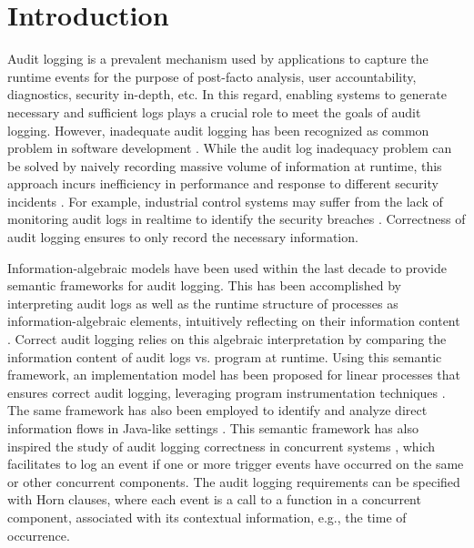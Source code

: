 \section{Introduction} \label{sec:intro}

Audit logging is a prevalent mechanism used by applications to capture the runtime events for the purpose of post-facto analysis, user accountability, diagnostics, security in-depth, etc. In this regard, enabling systems to generate necessary and sufficient logs plays a crucial role to meet the goals of audit logging. However, inadequate audit logging has been recognized as common problem in software development \cite{cve778, owasp-top-ten}. While the audit log inadequacy  problem can be solved by naively recording massive volume of information at runtime, this approach incurs inefficiency in performance  and response to different security incidents \cite{cwe779}. For example, industrial control systems may suffer from the lack of monitoring audit logs in realtime to identify the security breaches \cite{https://www.trendmicro.com/vinfo/de/security/news/cyber-attacks/why-do-attackers-target-industrial-control-systems}. Correctness of audit logging ensures to only record the necessary information. 

Information-algebraic \cite{Kohlas14}  models have been used within the last decade to provide semantic frameworks for audit logging. This has been accomplished by interpreting audit logs as well as the runtime structure of processes as information-algebraic elements, intuitively reflecting on their information content \cite{amir-chong-skalka-law15}. Correct audit logging relies on this algebraic interpretation by comparing the information content of audit logs vs. program at runtime. Using this semantic framework, an implementation model has been proposed for linear processes that ensures correct audit logging, leveraging program instrumentation techniques \cite{amir-chong-skalka-post16}. The same framework has also been employed to identify and analyze direct information flows in Java-like settings \cite{amir-skalka-plas16, jcs20}. This semantic framework has also inspired the study of audit logging correctness in concurrent systems \cite{lsfa20}, which facilitates to log an event if one or more trigger events have occurred on the same or other concurrent components. The audit logging requirements can be specified with Horn clauses, where each event is a call to a function in a concurrent component, associated with its contextual information, e.g., the time of occurrence. 

